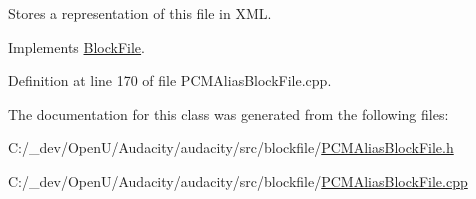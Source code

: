Stores a representation of this file in X\+ML. 



Implements \hyperlink{class_block_file_a62527189fe371325e23f3802f20282f8}{Block\+File}.



Definition at line 170 of file P\+C\+M\+Alias\+Block\+File.\+cpp.



The documentation for this class was generated from the following files\+:\begin{DoxyCompactItemize}
\item 
C\+:/\+\_\+dev/\+Open\+U/\+Audacity/audacity/src/blockfile/\hyperlink{_p_c_m_alias_block_file_8h}{P\+C\+M\+Alias\+Block\+File.\+h}\item 
C\+:/\+\_\+dev/\+Open\+U/\+Audacity/audacity/src/blockfile/\hyperlink{_p_c_m_alias_block_file_8cpp}{P\+C\+M\+Alias\+Block\+File.\+cpp}\end{DoxyCompactItemize}
